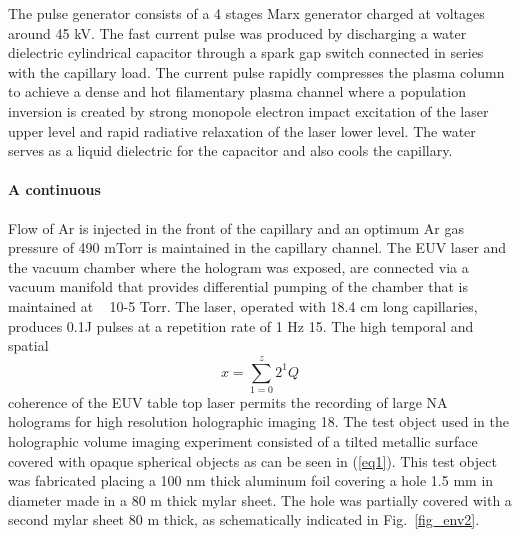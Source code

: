 \documentclass[]{IEEEphot}
\begin{document}
 The pulse generator consists of a 4 stages Marx generator charged at voltages around 45 kV. The fast current pulse was produced by discharging a water dielectric cylindrical capacitor through a spark gap switch connected in series with the capillary load. The current pulse rapidly compresses the plasma column to achieve a dense and hot filamentary plasma channel where a population inversion is created by strong monopole electron impact excitation of the laser upper level and rapid radiative relaxation of the laser lower level. The water serves as a liquid dielectric for the capacitor and also cools the capillary.  


\paragraph{A continuous} Flow of Ar is injected in the front of the capillary and an optimum Ar gas pressure of 490 mTorr is maintained in the capillary channel. The EUV laser and the vacuum chamber where the hologram was exposed, are connected via a vacuum manifold that provides differential pumping of the chamber that is maintained at ~ 10-5 Torr. The laser, operated with 18.4 cm long capillaries, produces 0.1J pulses at a repetition rate of 1 Hz 15. The high temporal and spatial  
\begin{equation}
x=\sum\limits_{1=0}^z 2^1Q
\label{eq1}
\end{equation}%
coherence of the EUV table top laser permits the recording of large NA holograms for high resolution holographic imaging 18. The test object used in the holographic volume imaging experiment consisted of a tilted metallic surface covered with opaque spherical objects as can be seen in (\ref{eq1}). This test object was fabricated placing a 100 nm thick aluminum foil covering a hole 1.5 mm in diameter made in a 80 m thick mylar sheet. The hole was partially covered with a second mylar sheet 80 m thick, as schematically indicated in Fig.~\ref{fig_env2}.
\end{document}
